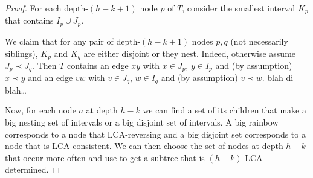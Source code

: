 \documentclass[kpfonts]{patmorin}
\begin{document}
\begin{proof}
  For each depth-$(h-k+1)$ node $p$ of $T$, consider the smallest interval $K_p$ that contains $I_p\cup J_p$.

  We claim that for any pair of depth-$(h-k+1)$ nodes $p,q$ (not necessarily siblings), $K_p$ and $K_q$ are either disjoint or they nest.  Indeed, otherwise assume $J_p\prec J_q$.  Then $T$ contains an edge $xy$ with $x\in J_p$, $y\in I_p$ and (by assumption) $x\prec y$ and an edge $vw$ with $v\in J_q$, $w\in I_q$ and (by assumption) $v\prec w$. blah di blah\ldots
  
  
  Now, for each node $a$ at depth $h-k$ we can find a set of its children that make a big nesting set of intervals or a big disjoint set of intervals.  A big rainbow corresponds to a node that LCA-reversing and a big disjoint set corresponds to a node that is LCA-consistent. We can then choose the set of nodes at depth $h-k$ that occur more often and use  to get a subtree that is $(h-k)$-LCA determined.
  

\end{proof}
\end{document}
